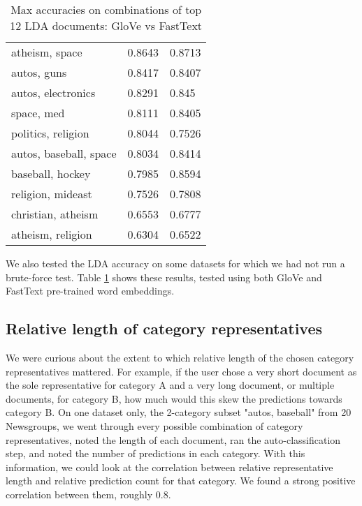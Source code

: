 \begin{table}[]
\begin{tabular}{lll}
atheism, space                              & 0.8643       & 0.8713                 \\
autos, guns                                 & 0.8417       & 0.8407                 \\
autos, electronics                          & 0.8291       & 0.845                  \\
space, med                                  & 0.8111       & 0.8405                 \\
politics, religion                          & 0.8044       & 0.7526                 \\
autos, baseball, space                       & 0.8034       & 0.8414                 \\
baseball, hockey                            & 0.7985       & 0.8594                 \\
religion, mideast                           & 0.7526       & 0.7808                 \\
christian, atheism                          & 0.6553       & 0.6777                 \\
atheism, religion                           & 0.6304       & 0.6522                 \\
\bottomrule
\end{tabular}
\caption{Max accuracies on combinations of top 12 LDA documents: GloVe vs FastText}\label{lda_fasttext}
\end{table}


We also tested the LDA accuracy on some datasets for which we had not run a brute-force test. Table \ref{lda_fasttext} shows these results, tested using both GloVe and FastText pre-trained word embeddings.

\subsection{Relative length of category representatives}
We were curious about the extent to which relative length of the chosen category representatives mattered. For example, if the user chose a very short document as the sole representative for category A and a very long document, or multiple documents, for category B, how much would this skew the predictions towards category B. On one dataset only, the 2-category subset "autos, baseball" from 20 Newsgroups, we went through every possible combination of category representatives, noted the length of each document, ran the auto-classification step, and noted the number of predictions in each category. With this information, we could look at the correlation between relative representative length and relative prediction count for that category. We found a strong positive correlation between them, roughly 0.8.
 